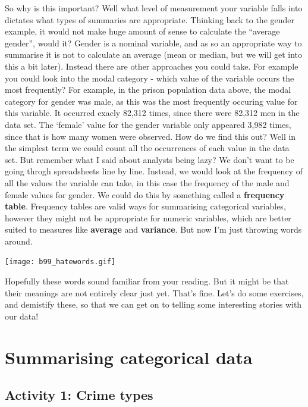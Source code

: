\documentclass[]{book}
\theoremstyle{definition}
\theoremstyle{definition}
\theoremstyle{definition}
\theoremstyle{remark}
\begin{document}
So why is this important? Well what level of measurement your variable
falls into dictates what types of summaries are appropriate. Thinking
back to the gender example, it would not make huge amount of sense to
calculate the ``average gender'', would it? Gender is a nominal
variable, and as so an appropriate way to summarise it is not to
calculate an average (mean or median, but we will get into this a bit
later). Instead there are other approaches you could take. For example
you could look into the modal category - which value of the variable
occurs the most frequently? For example, in the prison population data
above, the modal category for gender was male, as this was the most
frequently occuring value for this variable. It occurred exacly 82,312
times, since there were 82,312 men in the data set. The `female' value
for the gender variable only appeared 3,982 times, since that is how
many women were observed. How do we find this out? Well in the simplest
term we could count all the occurrences of each value in the data set.
But remember what I said about analysts being lazy? We don't want to be
going throgh spreadsheets line by line. Instead, we would look at the
frequency of all the values the variable can take, in this case the
frequency of the male and female values for gender. We could do this by
something called a \textbf{frequency table}. Frequency tables are valid
ways for summarising categorical variables, however they might not be
appropriate for numeric variables, which are better suited to measures
like \textbf{average} and \textbf{variance}. But now I'm just throwing
words around.

\texttt{[image: b99\_hatewords.gif]}

Hopefully these words sound familiar from your reading. But it might be
that their meanings are not entirely clear just yet. That's fine. Let's
do some exercises, and demistify these, so that we can get on to telling
some interesting stories with our data!

\hypertarget{summarising-categorical-data}{%
\section{Summarising categorical
data}\label{summarising-categorical-data}}

\hypertarget{activity-1-crime-types}{%
\subsection{Activity 1: Crime types}\label{activity-1-crime-types}}
\end{document}
